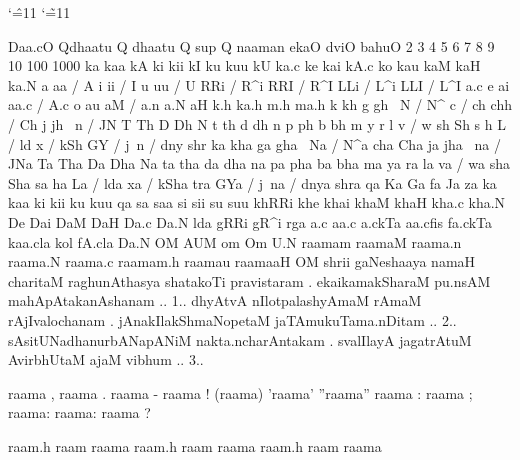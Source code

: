 \documentclass[12pt]{article}
\newcommand\isan{
	\catcode`\^=11
           \catcode`\~=11
           \fontspec[Script=Devanagari,Language=Sanskrit,Mapping=itrans-dvn]{FreeSans}
           }
\begin{document}
{\isan
Daa.cO Qdhaatu Q dhaatu Q sup Q naaman ekaO dviO bahuO
 2 3 4 5 6 7 8 9 10 100 1000
\bigskip
ka kaa kA ki kii kI ku kuu kU ka.c ke kai kA.c ko kau kaM kaH ka.N 
\bigskip
a     aa / A       i      ii / I       u     uu / U 
RRi / R^i    RRI / R^I    LLi / L^i    LLI / L^I
a.c     e      ai     aa.c / A.c   o     au     aM / a.n   a.N   aH
\bigskip
k.h ka.h m.h ma.h
k     kh     g     gh     ~N / N^
c / ch    chh / Ch     j     jh     ~n / JN
T     Th     D     Dh     N
t     th     d     dh     n
p     ph     b     bh     m
y     r      l     v / w
sh    Sh     s     h      L / ld
x / kSh     GY / j~n / dny     shr
\bigskip
ka     kha     ga     gha     ~Na / N^a
cha    Cha     ja     jha     ~na / JNa
Ta     Tha     Da     Dha     Na
ta     tha     da     dha     na
pa     pha     ba     bha     ma
ya     ra      la     va / wa
sha    Sha     sa     ha      La / lda
xa / kSha  tra   GYa / j~na / dnya     shra
qa Ka Ga fa Ja za 
\bigskip
ka kaa ki kii ku kuu qa 
sa saa si sii su suu
khRRi khe khai khaM khaH kha.c kha.N 
De Dai DaM DaH Da.c Da.N
lda gRRi gR^i rga 
a.c aa.c a.ckTa 
aa.cfis fa.ckTa kaa.cla kol fA.cla 
Da.N OM AUM om Om U.N
raamam raamaM raama.n raama.N 
raama.c raamam.h raamau raamaaH
\bigskip
OM shrii gaNeshaaya namaH 
\bigskip
charitaM raghunAthasya shatakoTi pravistaram .
ekaikamakSharaM pu.nsAM mahApAtakanAshanam .. 1..
dhyAtvA nIlotpalashyAmaM rAmaM rAjIvalochanam .
jAnakIlakShmaNopetaM jaTAmukuTama.nDitam .. 2..
sAsitUNadhanurbANapANiM nakta.ncharAntakam .
svalIlayA jagatrAtuM AvirbhUtaM ajaM vibhum .. 3..

raama , raama . raama - raama ! (raama) 'raama'
''raama'' raama : raama ; raama: raama: raama ?

raam.h raam raama raam.h raam raama raam.h raam raama
}
\end{document}
